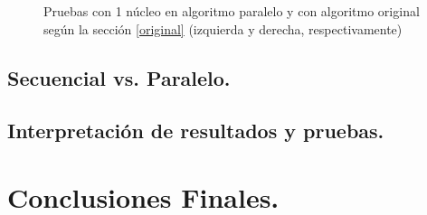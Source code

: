 \documentclass{article}
\begin{document}
\begin{figure}[htp]
	\hspace*{-2cm}
	\caption{Pruebas con 1 núcleo en algoritmo paralelo y con algoritmo original según la sección \ref{original} (izquierda y derecha, respectivamente)}
\end{figure}

\subsection{Secuencial vs. Paralelo.}
\subsection{Interpretación de resultados y pruebas.}

\section{Conclusiones Finales.\label{conclusiones}}
\end{document}
